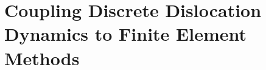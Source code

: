 \chapter{Coupling Discrete Dislocation Dynamics to Finite Element Methods}

\inputminted[breaklines, linenos, fontsize=\normalsize]{matlab}{../EasyDD/extract_node_plane.m}

\inputminted[breaklines, linenos, fontsize=\normalsize]{matlab}{../EasyDD/extract_node_planes.m}

\inputminted[breaklines, linenos, fontsize=\normalsize]{matlab}{../EasyDD/analytic_traction.m}
